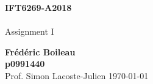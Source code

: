 \begin{titlepage}
\begin{center}
\vspace*{1cm}
\textbf{IFT6269-A2018}\\
\\
\vspace{0.5cm}
Assignment I

\vspace{1.5cm}

\textbf{Frédéric Boileau}\\
\textbf{p0991440}\\
\vspace{2cm}
Prof. 
Simon Lacoste-Julien
\vfill
\today
\thispagestyle{empty}
\end{center}
\end{titlepage}
\clearpage
